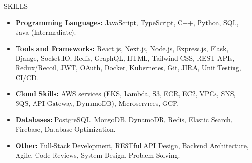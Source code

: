 \documentclass{resume} %
\begin{document}
\begin{rSection}{SKILLS}
\begin{itemize}
\itemsep -3pt {}
\item
\textbf{Programming Languages:} JavaScript, TypeScript, C++, Python, SQL, Java (Intermediate). \\
\vspace{1pt} %

\item
\textbf{Tools and Frameworks:} React.js, Next.js, Node.js, Express.js, Flask, Django, Socket.IO, Redis, GraphQL, HTML, Tailwind CSS, REST APIs, Redux/Recoil, JWT, OAuth, Docker, Kubernetes, Git, JIRA, Unit Testing, CI/CD. \\
\vspace{1pt} %

\item
\textbf{Cloud Skills:} AWS services (EKS, Lambda, S3, ECR, EC2, VPCs, SNS, SQS, API Gateway, DynamoDB), Microservices, GCP. \\
\vspace{1pt} %

\item
\textbf{Databases:} PostgreSQL, MongoDB, DynamoDB, Redis, Elastic Search, Firebase, Database Optimization. \\
\vspace{1pt} %

\item
\textbf{Other:} Full-Stack Development, RESTful API Design, Backend Architecture, Agile, Code Reviews, System Design, Problem-Solving. \\
\end{itemize}
\end{rSection}

\end{document}
